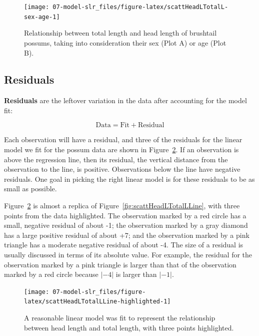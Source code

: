 \documentclass[
  10pt,
  openany]{book}
\begin{document}
\begin{figure}[h]

{\centering \texttt{[image: 07-model-slr\_files/figure-latex/scattHeadLTotalL-sex-age-1]} 

}

\caption{Relationship between total length and head length of brushtail possums, taking into consideration their sex (Plot A) or age (Plot B).}\label{fig:scattHeadLTotalL-sex-age}
\end{figure}

\hypertarget{resids}{%
\subsection{Residuals}\label{resids}}

\textbf{Residuals} are the leftover variation in the data after accounting for the model fit:

\[\text{Data} = \text{Fit} + \text{Residual}\]

Each observation will have a residual, and three of the residuals for the linear model we fit for the possum data are shown in Figure~\ref{fig:scattHeadLTotalLLine-highlighted}.
If an observation is above the regression line, then its residual, the vertical distance from the observation to the line, is positive.
Observations below the line have negative residuals.
One goal in picking the right linear model is for these residuals to be as small as possible.

Figure~\ref{fig:scattHeadLTotalLLine-highlighted} is almost a replica of Figure~\ref{fig:scattHeadLTotalLLine}, with three points from the data highlighted.
The observation marked by a red circle has a small, negative residual of about -1; the observation marked by a gray diamond has a large positive residual of about +7; and the observation marked by a pink triangle has a moderate negative residual of about -4.
The size of a residual is usually discussed in terms of its absolute value.
For example, the residual for the observation marked by a pink triangle is larger than that of the observation marked by a red circle because \(|-4|\) is larger than \(|-1|.\)

\begin{figure}[h]

{\centering \texttt{[image: 07-model-slr\_files/figure-latex/scattHeadLTotalLLine-highlighted-1]} 

}

\caption{A reasonable linear model was fit to represent the relationship between head length and total length, with three points highlighted.}\label{fig:scattHeadLTotalLLine-highlighted}
\end{figure}
\end{document}
